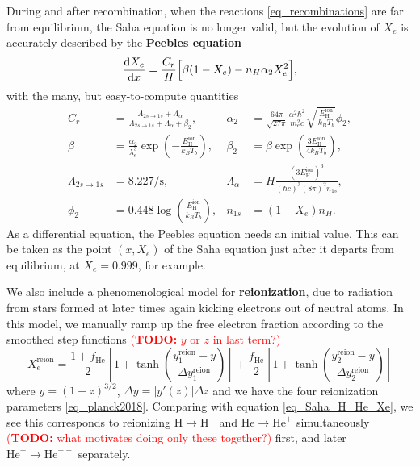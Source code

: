\documentclass[10pt,a4paper]{article}
\newcommand\TODO[1]{\textcolor{red}{(\textbf{TODO:} #1)}}
\begin{document}
During and after recombination, when the reactions \eqref{eq_recombinations} are far from equilibrium,
the Saha equation is no longer valid,
but the evolution of $X_e$ is accurately described by the \textbf{Peebles equation}
\begin{equation}
	\odv{X_e}{x} = \frac{C_r}{H} \Big[ \beta (1-X_e) - n_H \alpha_2 X_e^2 \Big],
\label{eq_Peebles}
\end{equation}
with the many, but easy-to-compute quantities
\begin{align*}
	C_r &= \frac{\Lambda_{2s \rightarrow 1s} + \Lambda_\alpha}{\Lambda_{2s \rightarrow 1s} + \Lambda_\alpha + \beta_2}, &
	\alpha_2 &= \frac{64 \pi}{\sqrt{27 \pi}} \frac{\alpha^2 \hbar^2}{m_e^2 c} \sqrt{\frac{E^\text{ion}_\text{H}}{k_B T_b}} \phi_2, \\
	\beta &= \frac{\alpha_2}{\lambda_e^3} \exp \left(-\frac{E^\text{ion}_\text{H}}{k_B T_b}\right), &
	\beta_2 &= \beta \exp \left(\frac{3 E^\text{ion}_\text{H}}{4 k_B T_b}\right), \\
	\Lambda_{2s \rightarrow 1s} &= 8.227 / \mathrm{s}, &
	\Lambda_\alpha &= H \frac{(3 E^\text{ion}_{\text{H}})^3}{(\hbar c)^3 (8 \pi)^2 n_{1s}}, \\
	\phi_2 &= 0.448 \log \left( \frac{E^\text{ion}_\text{H}}{k_B T_b} \right), &
	n_{1s} &= (1-X_e) n_H.
\end{align*}
As a differential equation, the Peebles equation needs an initial value.
This can be taken as the point $(x, X_e)$ of the Saha equation just after it departs from equilibrium, at $X_e = 0.999$, for example.

We also include a phenomenological model for \textbf{reionization}, due to radiation from stars formed at later times again kicking electrons out of neutral atoms.
In this model, we manually ramp up the free electron fraction according to the smoothed step functions
\TODO{$y$ or $z$ in last term?}
\begin{equation}
	X_e^\text{reion} = \frac{1+f_\text{He}}{2} \left[ 1 + \tanh \left( \frac{y^\text{reion}_1-y}{\Delta y^\text{reion}_1} \right) \right]
                     + \frac{f_\text{He}}{2} \left[ 1 + \tanh \left( \frac{y^\text{reion}_2-y}{\Delta y^\text{reion}_2} \right) \right]
\label{eq_reionization}
\end{equation}
where $y = (1+z)^{3/2}$, $\Delta y = |y'(z)| \Delta z$ and we have the four reionization parameters \eqref{eq_planck2018}.
Comparing with equation \eqref{eq_Saha_H_He_Xe}, we see this corresponds to reionizing $\text{H} \rightarrow \text{H}^+$ and $\text{He} \rightarrow \text{He}^+$ simultaneously \TODO{what motivates doing only these together?} first,
and later $\text{He}^{+} \rightarrow \text{He}^{++}$ separately.
\end{document}
